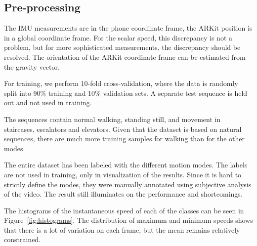 \documentclass{article}
\begin{document}
\subsection{Pre-processing}

The IMU measurements are in the phone coordinate frame, the ARKit position is in a global coordinate frame. For the scalar speed, this discrepancy is not a problem, but for more sophisticated measurements, the discrepancy should be resolved. The orientation of the ARKit coordinate frame can be estimated from the gravity vector.

For training, we perform 10-fold cross-validation, where the data is randomly split into 90\% training and 10\% validation sets. A separate test sequence is held out and not used in training. 

The sequences contain normal walking, standing still, and movement in staircases, escalators and elevators. Given that the dataset is based on natural sequences, there are much more training samples for walking than for the other modes.

The entire dataset has been labeled with the different motion modes. The labels are not used in training, only in visualization of the results. Since it is hard to strictly define the modes, they were manually annotated using subjective analysis of the video. The result still illuminates on the performance and shortcomings.

The histograms of the instantaneous speed of each of the classes can be seen in Figure~\ref{fig:histograms}. The distribution of maximum and minimum speeds shows that there is a lot of variation on each frame, but the mean remains relatively constrained.
\end{document}
